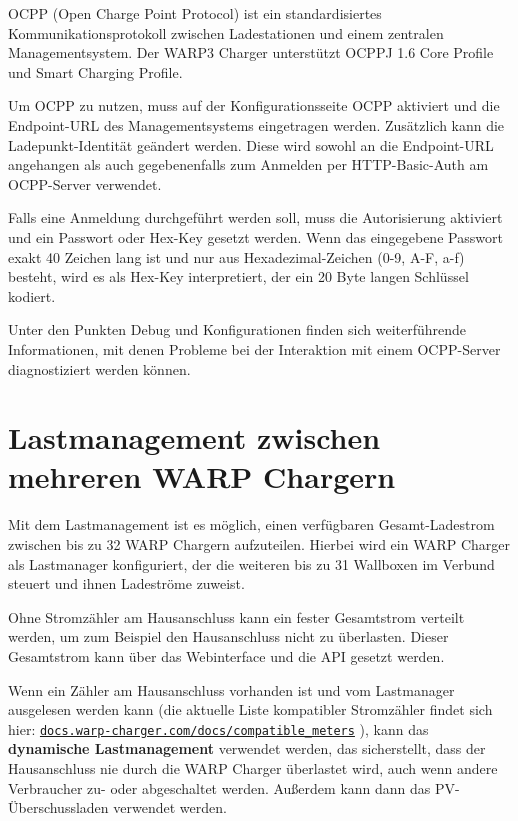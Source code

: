 \documentclass[a4paper,10pt]{article}
\newcommand\rurl[2]{%
  \href{#1}{\nolinkurl{#2}}%
}
\begin{document}
\begin{multicols*}{2}
    OCPP (Open Charge Point Protocol) ist ein standardisiertes Kommunikationsprotokoll zwischen
    Ladestationen und einem zentralen Managementsystem. Der WARP3 Charger
    unterstützt OCPPJ 1.6 Core Profile und Smart Charging Profile.

    Um OCPP zu nutzen, muss auf der Konfigurationsseite OCPP aktiviert und die
    Endpoint-URL des Managementsystems eingetragen werden. Zusätzlich kann die Ladepunkt-Identität
    geändert werden. Diese wird sowohl an die Endpoint-URL angehangen als auch gegebenenfalls zum
    Anmelden per HTTP-Basic-Auth am OCPP-Server verwendet.

    Falls eine Anmeldung durchgeführt werden soll, muss die Autorisierung aktiviert
    und ein Passwort oder Hex-Key gesetzt werden. Wenn das eingegebene Passwort exakt 40 Zeichen lang ist
    und nur aus Hexadezimal-Zeichen (0-9, A-F, a-f) besteht, wird es als Hex-Key interpretiert, der ein 20
    Byte langen Schlüssel kodiert.

    Unter den Punkten Debug und Konfigurationen finden sich weiterführende Informationen, mit denen Probleme
    bei der Interaktion mit einem OCPP-Server diagnostiziert werden können.

	\newpage
    \section{Lastmanagement zwischen mehreren WARP Chargern}\label{charge_manager}
    Mit dem Lastmanagement ist es möglich, einen verfügbaren Gesamt-Ladestrom zwischen bis zu 32 WARP Chargern aufzuteilen. Hierbei wird ein WARP Charger als Lastmanager konfiguriert, der die weiteren bis zu 31 Wallboxen im Verbund steuert und ihnen Ladeströme zuweist.

    Ohne Stromzähler am Hausanschluss kann ein fester Gesamtstrom verteilt werden, um zum Beispiel den Hausanschluss nicht zu überlasten. Dieser Gesamtstrom kann über das Webinterface und die API gesetzt werden.

    Wenn ein Zähler am Hausanschluss vorhanden ist und vom Lastmanager ausgelesen werden kann (die aktuelle Liste kompatibler Stromzähler findet sich hier: \rurl{https://docs.warp-charger.com/docs/compatible\_meters}{docs.warp-charger.com/docs/compatible\_meters}), kann das \textbf{dynamische Lastmanagement} verwendet werden, das sicherstellt, dass der Hausanschluss nie durch die WARP Charger überlastet wird, auch wenn andere Verbraucher zu- oder abgeschaltet werden. Außerdem kann dann das PV-Überschussladen verwendet werden.


\end{multicols*}
\end{document}
